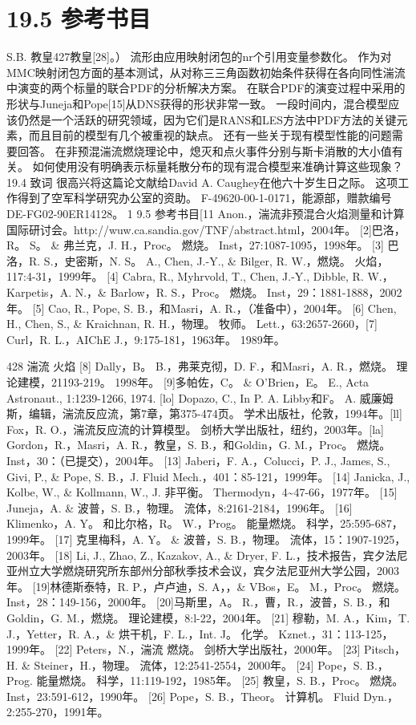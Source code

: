 \documentclass[UTF8,11pt,a4paper,openany,fontset=fandol]{ctexbook}
\begin{document}
\section{19.5 参考书目}
S.B. 教皇427教皇[28]。） 流形由应用映射闭包的nr个引用变量参数化。 作为对MMC映射闭包方面的基本测试，从对称三三角函数初始条件获得在各向同性湍流中演变的两个标量的联合PDF的分析解决方案。 在联合PDF的演变过程中采用的形状与Juneja和Pope[15]从DNS获得的形状非常一致。 一段时间内，混合模型应该仍然是一个活跃的研究领域，因为它们是RANS和LES方法中PDF方法的关键元素，而且目前的模型有几个被重视的缺点。 还有一些关于现有模型性能的问题需要回答。 在非预混湍流燃烧理论中，熄灭和点火事件分别与斯卡消散的大小值有关。 如何使用没有明确表示标量耗散分布的现有混合模型来准确计算这些现象？ 19.4 致词 很高兴将这篇论文献给David A. Caughey在他六十岁生日之际。 这项工作得到了空军科学研究办公室的资助。 F-49620-00-1-0171，能源部，赠款编号DE-FG02-90ER14128。 1 9.5 参考书目[11 Anon.，湍流非预混合火焰测量和计算国际研讨会。http://wuw.ca.sandia.gov/TNF/abstract.html，2004年。 [2]巴洛，R。 S。 \& 弗兰克，J. H.，Proc。 燃烧。 Inst，27:1087-1095，1998年。 [3] 巴洛，R. S.，史密斯，N. S。 A., Chen, J.-Y., \& Bilger, R. W.，燃烧。 火焰，117:4-31，1999年。 [4] Cabra, R., Myhrvold, T., Chen, J.-Y., Dibble, R. W.，Karpetis，A. N.，\& Barlow，R. S.，Proc。 燃烧。 Inst，29：1881-1888，2002年。 [5] Cao, R., Pope, S. B.，和Masri，A. R.，（准备中），2004年。 [6] Chen, H., Chen, S., \& Kraichnan, R. H.，物理。 牧师。 Lett.，63:2657-2660，[7] Curl，R. L.，AIChE J.，9:175-181，1963年。 1989年。

428 湍流 火焰 [8] Dally，B。 B.，弗莱克彻，D. F.，和Masri，A. R.，燃烧。 理论建模，21193-219。 1998年。 [9]多帕佐，C。 \& O'Brien，E。 E., Acta Astronaut., 1:1239-1266, 1974. [lo] Dopazo, C., In P. A. Libby和F。 A. 威廉姆斯，编辑，湍流反应流，第7章，第375-474页。 学术出版社，伦敦，1994年。[ll] Fox，R. O.，湍流反应流的计算模型。 剑桥大学出版社，纽约，2003年。[la] Gordon，R.，Masri，A. R.，教皇，S. B.，和Goldin，G. M.，Proc。 燃烧。 Inst，30：（已提交），2004年。 [13] Jaberi，F. A.，Colucci，P. J., James, S., Givi, P., \& Pope, S. B.，J. Fluid Mech.，401：85-121，1999年。 [14] Janicka, J., Kolbe, W., \& Kollmann, W., J. 非平衡。 Thermodyn，4\textasciitilde{}47-66，1977年。 [15] Juneja，A. \& 波普，S. B.，物理。 流体，8:2161-2184，1996年。 [16] Klimenko，A. Y。 和比尔格，R。 W.，Prog。 能量燃烧。 科学，25:595-687，1999年。 [17] 克里梅科，A. Y。 \& 波普，S. B.，物理。 流体，15：1907-1925，2003年。 [18] Li, J., Zhao, Z., Kazakov, A., \& Dryer, F. L.，技术报告，宾夕法尼亚州立大学燃烧研究所东部州分部秋季技术会议，宾夕法尼亚州大学公园，2003年。 [19]林德斯泰特，R. P.，卢卢迪，S. A，，\& VBos，E。 M.，Proc。 燃烧。 Inst，28：149-156，2000年。 [20]马斯里，A。 R.，曹，R.，波普，S. B.，和Goldin，G. M.，燃烧。 理论建模，8:l-22，2004年。 [21] 穆勒，M. A.，Kim，T. J.，Yetter，R. A.，\& 烘干机，F. L.，Int. J。 化学。 Kznet.，31：113-125，1999年。 [22] Peters，N.，湍流 燃烧。 剑桥大学出版社，2000年。 [23] Pitsch，H. \& Steiner，H.，物理。 流体，12:2541-2554，2000年。 [24] Pope，S. B.，Prog. 能量燃烧。 科学，11:119-192，1985年。 [25] 教皇，S. B.，Proc。 燃烧。 Inst，23:591-612，1990年。 [26] Pope，S. B.，Theor。 计算机。 Fluid Dyn.，2:255-270，1991年。
\end{document}
